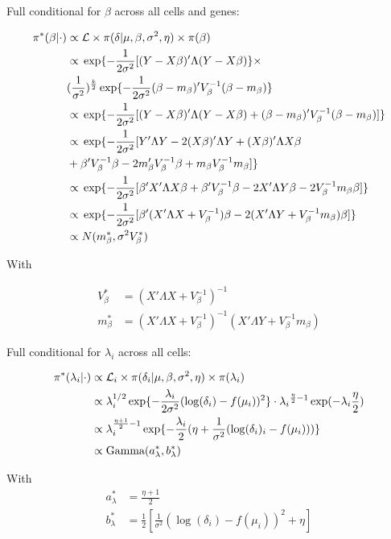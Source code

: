 Full conditional for $\beta$ across all cells and genes:
\begin{fleqn}
\begin{align*}
\pi^*(\beta|\cdot)&\propto{} \mathcal{L}\times\pi(\delta|\mu,\beta,\sigma^2,\eta)\times\pi(\beta)\\
&\propto{}\exp\lbrace-\frac{1}{2\sigma^2}[(Y-X\beta)'\Lambda(Y-X\beta)\rbrace\times\\
&(\frac{1}{\sigma^2})^{\frac{k}{2}}\exp\lbrace-\frac{1}{2\sigma^2}(\beta-m_\beta)'V_\beta^{-1}(\beta-m_\beta)\rbrace\\
&\propto{}\exp\lbrace-\frac{1}{2\sigma^2}[(Y-X\beta)'\Lambda(Y-X\beta)+(\beta-m_\beta)'V_\beta^{-1}(\beta-m_\beta)]\rbrace\\
&\propto{}\exp\lbrace-\frac{1}{2\sigma^2}[Y'\Lambda{}Y-2(X\beta)'\Lambda{}Y+(X\beta)'\Lambda{}X\beta\\
&+\beta'V_\beta^{-1}\beta-2m_\beta'V_\beta^{-1}\beta+m_\beta{}V_\beta^{-1}m_\beta{}]\rbrace\\
&\propto{}\exp\lbrace-\frac{1}{2\sigma^2}[\beta'X'\Lambda{}X\beta+\beta'V_\beta^{-1}\beta-2X'\Lambda{}Y\beta-2V_\beta^{-1}m_\beta\beta]\rbrace\\
&\propto{}\exp\lbrace-\frac{1}{2\sigma^2}[\beta'(X'\Lambda{}X+V_\beta^{-1})\beta-2(X'\Lambda{}Y+V_\beta^{-1}m_\beta)\beta]\rbrace\\
&\propto{}N(m^*_\beta,\sigma^2V^*_\beta)
\end{align*}
\end{fleqn} With
\begin{fleqn}
\begin{align*}
V^*_\beta&=(X'\Lambda{}X+V_\beta^{-1})^{-1}\\
m^*_\beta&=(X'\Lambda{}X+V_\beta^{-1})^{-1}(X'\Lambda{}Y+V_\beta^{-1}m_\beta{})
\end{align*}

Full conditional for $\lambda_i$ across all cells:
\begin{fleqn}
\begin{align*}
\pi^*(\lambda_i|\cdot)&\propto{}\mathcal{L}_i\times\pi(\delta_i|\mu,\beta,\sigma^2,\eta)\times\pi(\lambda_i)\\
&\propto{}\lambda_i^{1/2}\exp\lbrace-\frac{\lambda_i}{2\sigma^2}(\log(\delta_i)-f(\mu_i))^2\rbrace\cdot\lambda_i{}^{\frac{\eta}{2}-1}\exp(-\lambda_i{}\frac{\eta}{2})\\
&\propto{}\lambda_i^{\frac{\eta+1}{2}-1}\exp\lbrace-\frac{\lambda_i}{2}(\eta+\frac{1}{\sigma^2}(\log(\delta_i)_i-f(\mu_i)))\rbrace\\
&\propto{}\textnormal{Gamma}(a^*_\lambda,b^*_\lambda)
\end{align*}
\end{fleqn}
With
\begin{align*}
a^*_\lambda&=\frac{\eta+1}{2}\\
b^*_\lambda&=\frac{1}{2}\left[\frac{1}{\sigma^2}(\log(\delta_i)-f(\mu_i))^2+\eta\right]
\end{align*}
\end{fleqn}

